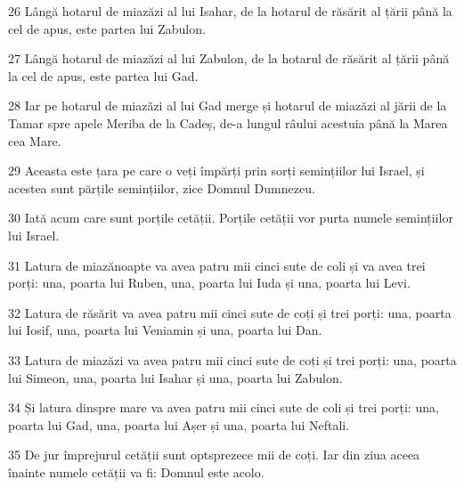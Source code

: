 \par 26 Lângă hotarul de miazăzi al lui Isahar, de la hotarul de răsărit al țării până la cel de apus, este partea lui Zabulon.
\par 27 Lângă hotarul de miazăzi al lui Zabulon, de la hotarul de răsărit al țării până la cel de apus, este partea lui Gad.
\par 28 Iar pe hotarul de miazăzi al lui Gad merge și hotarul de miazăzi al jării de la Tamar spre apele Meriba de la Cadeș, de-a lungul râului acestuia până la Marea cea Mare.
\par 29 Aceasta este țara pe care o veți împărți prin sorți semințiilor lui Israel, și acestea sunt părțile semințiilor, zice Domnul Dumnezeu.
\par 30 Iată acum care sunt porțile cetății. Porțile cetății vor purta numele semințiilor lui Israel.
\par 31 Latura de miazănoapte va avea patru mii cinci sute de coli și va avea trei porți: una, poarta lui Ruben, una, poarta lui Iuda și una, poarta lui Levi.
\par 32 Latura de răsărit va avea patru mii cinci sute de coți și trei porți: una, poarta lui Iosif, una, poarta lui Veniamin și una, poarta lui Dan.
\par 33 Latura de miazăzi va avea patru mii cinci sute de coți și trei porți: una, poarta lui Simeon, una, poarta lui Isahar și una, poarta lui Zabulon.
\par 34 Și latura dinspre mare va avea patru mii cinci sute de coli și trei porți: una, poarta lui Gad, una, poarta lui Așer și una, poarta lui Neftali.
\par 35 De jur împrejurul cetății sunt optsprezece mii de coți. Iar din ziua aceea înainte numele cetății va fi: Domnul este acolo.


